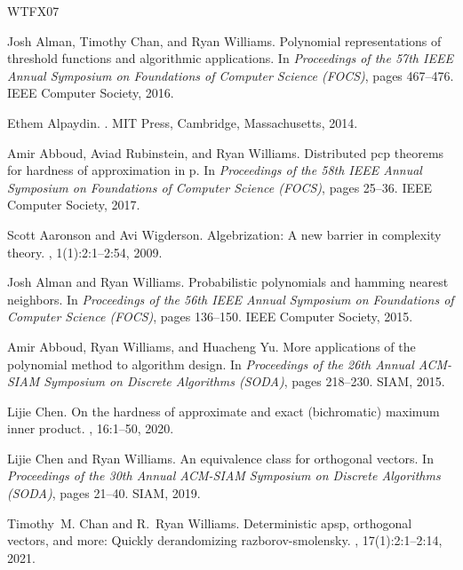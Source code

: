 \documentclass[11pt]{article}
\theoremstyle{plain}
\theoremstyle{remark}
\begin{document}
 
\newcommand{\etalchar}[1]{$^{#1}$}
\begin{thebibliography}{WTFX07}

Josh Alman, Timothy Chan, and Ryan Williams.
\newblock Polynomial representations of threshold functions and algorithmic
  applications.
\newblock In {\em Proceedings of the 57th IEEE Annual Symposium on Foundations
  of Computer Science (FOCS)}, pages 467--476. IEEE Computer Society, 2016.

Ethem Alpaydin.
.
\newblock MIT Press, Cambridge, Massachusetts, 2014.

Amir Abboud, Aviad Rubinstein, and Ryan Williams.
\newblock Distributed pcp theorems for hardness of approximation in p.
\newblock In {\em Proceedings of the 58th IEEE Annual Symposium on Foundations
  of Computer Science (FOCS)}, pages 25--36. IEEE Computer Society, 2017.

Scott Aaronson and Avi Wigderson.
\newblock Algebrization: A new barrier in complexity theory.
, 1(1):2:1--2:54, 2009.

Josh Alman and Ryan Williams.
\newblock Probabilistic polynomials and hamming nearest neighbors.
\newblock In {\em Proceedings of the 56th IEEE Annual Symposium on Foundations
  of Computer Science (FOCS)}, pages 136--150. IEEE Computer Society, 2015.

Amir Abboud, Ryan Williams, and Huacheng Yu.
\newblock More applications of the polynomial method to algorithm design.
\newblock In {\em Proceedings of the 26th Annual ACM-SIAM Symposium on Discrete
  Algorithms (SODA)}, pages 218--230. SIAM, 2015.

Lijie Chen.
\newblock On the hardness of approximate and exact (bichromatic) maximum inner
  product.
, 16:1--50, 2020.

Lijie Chen and Ryan Williams.
\newblock An equivalence class for orthogonal vectors.
\newblock In {\em Proceedings of the 30th Annual ACM-SIAM Symposium on Discrete
  Algorithms (SODA)}, pages 21--40. SIAM, 2019.

Timothy~M. Chan and R.~Ryan Williams.
\newblock Deterministic apsp, orthogonal vectors, and more: Quickly
  derandomizing razborov-smolensky.
, 17(1):2:1--2:14, 2021.


\end{thebibliography}
\end{document}
